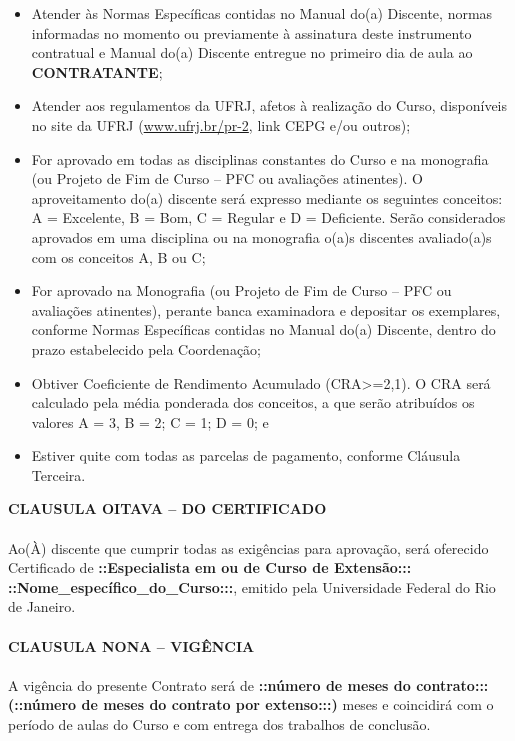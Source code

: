 \documentclass[a4paper,7.5pt]{article}
\begin{document}
\begin{itemize}
 \setlength{\itemsep}{1pt}
  \setlength{\parskip}{0pt}
  \setlength{\parsep}{0pt}
\item Atender às Normas Específicas contidas no Manual do(a) Discente, normas informadas no momento ou previamente à assinatura deste instrumento contratual e Manual do(a) Discente entregue no primeiro dia de aula ao {\bf CONTRATANTE};
\item Atender aos regulamentos da UFRJ, afetos à realização do Curso, disponíveis no site da UFRJ (\url{www.ufrj.br/pr-2}, link CEPG e/ou outros);
\item For aprovado em todas as disciplinas constantes do Curso e na monografia (ou Projeto de Fim de Curso – PFC ou avaliações atinentes). O aproveitamento do(a) discente será expresso mediante os seguintes conceitos: A = Excelente, B = Bom, C = Regular e D = Deficiente. Serão considerados aprovados em uma disciplina ou na monografia o(a)s discentes avaliado(a)s com os conceitos A, B ou C;
\item For aprovado na Monografia (ou Projeto de Fim de Curso – PFC ou avaliações atinentes), perante banca examinadora e depositar os exemplares, conforme Normas Específicas contidas no Manual do(a) Discente, dentro do prazo estabelecido pela Coordenação;
\item Obtiver Coeficiente de Rendimento Acumulado (CRA>=2,1). O CRA será calculado pela média ponderada dos conceitos, a que serão atribuídos os valores A = 3, B = 2; C = 1; D = 0; e
\item Estiver quite com todas as parcelas de pagamento, conforme Cláusula Terceira.
\end{itemize}
{\bf CLAUSULA OITAVA – DO CERTIFICADO}
\\\\
\indent Ao(À) discente que cumprir todas as exigências para aprovação, será oferecido Certificado de {\bf ::Especialista em ou de Curso de Extensão::: ::Nome\_específico\_do\_Curso:::}, emitido pela Universidade Federal do Rio de Janeiro.
\\\\
{\bf CLAUSULA NONA – VIGÊNCIA}
\\\\
\indent A vigência do presente Contrato será de {\bf ::número de meses do contrato::: (::número de meses do contrato por extenso:::)} meses e coincidirá com o período de aulas do Curso e com entrega dos trabalhos de conclusão.
\\\\
\end{document}
